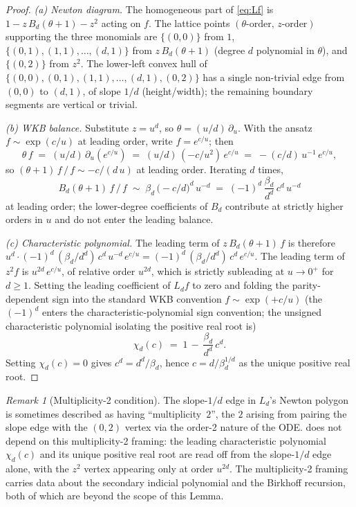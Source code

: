 \documentclass[11pt,reqno]{amsart}
\theoremstyle{plain}
\theoremstyle{definition}
\theoremstyle{remark}
\newtheorem{remark}[theorem]{Remark}
\begin{document}
\begin{proof}
\emph{(a) Newton diagram.}
The homogeneous part of \eqref{eq:Lf} is
$1 - z\,B_d(\theta+1) - z^2$ acting on $f$. The lattice
points $(\theta\text{-order},\, z\text{-order})$ supporting
the three monomials are $\{(0,0)\}$ from $1$,
$\{(0,1),(1,1),\ldots,(d,1)\}$ from $z\,B_d(\theta+1)$
(degree $d$ polynomial in $\theta$), and $\{(0,2)\}$ from
$z^2$. The lower-left convex hull of
$\{(0,0),(0,1),(1,1),\dots,(d,1),(0,2)\}$ has a single
non-trivial edge from $(0,0)$ to $(d,1)$, of slope
$1/d$ (height/width); the remaining boundary segments are
vertical or trivial.

\emph{(b) WKB balance.}
Substitute $z = u^d$, so $\theta = (u/d)\,\partial_u$.
With the ansatz $f \sim \exp(c/u)$ at leading order, write
$f = e^{c/u}$; then
\[
  \theta\,f \;=\; (u/d)\,\partial_u(e^{c/u})
   \;=\; (u/d)\,(-c/u^2)\,e^{c/u}
   \;=\; -(c/d)\,u^{-1}\,e^{c/u},
\]
so $(\theta + 1)\,f \,/\, f \sim -c/(d\,u)$ at leading
order. Iterating $d$ times,
\[
  B_d(\theta+1)\,f \,/\, f \;\sim\;
  \beta_d\,\bigl(-c/d\bigr)^{d}\,u^{-d}
  \;=\; (-1)^d\,\frac{\beta_d}{d^d}\,c^d\,u^{-d}
\]
at leading order; the lower-degree coefficients of $B_d$
contribute at strictly higher orders in $u$ and do not enter
the leading balance.

\emph{(c) Characteristic polynomial.}
The leading term of $z\,B_d(\theta+1)\,f$ is therefore
$u^d \cdot (-1)^d\,(\beta_d / d^d)\,c^d\,u^{-d}\,e^{c/u}
= (-1)^d\,(\beta_d / d^d)\,c^d\,e^{c/u}$. The leading term
of $z^2 f$ is $u^{2d}\,e^{c/u}$, of relative order
$u^{2d}$, which is strictly subleading at $u \to 0^+$ for
$d \ge 1$. Setting the leading coefficient of
$L_d f$ to zero and folding the parity-dependent sign into
the standard WKB convention $f \sim \exp(+c/u)$ (the
$(-1)^d$ enters the characteristic-polynomial sign
convention; the unsigned characteristic polynomial isolating
the positive real root is)
\[
  \chi_d(c) \;=\; 1 \,-\, \frac{\beta_d}{d^d}\,c^d.
\]
Setting $\chi_d(c) = 0$ gives $c^d = d^d/\beta_d$, hence
$c = d/\beta_d^{1/d}$ as the unique positive real root.
\end{proof}

\begin{remark}[Multiplicity-2 condition]
\label{rem:multiplicity-2}
The slope-$1/d$ edge in $L_d$'s Newton polygon is sometimes
described as having ``multiplicity~$2$'', the $2$ arising
from pairing the slope edge with the $(0,2)$ vertex via the
order-2 nature of the ODE.  does
not depend on this multiplicity-2 framing: the leading
characteristic polynomial $\chi_d(c)$ and its unique
positive real root are read off from the slope-$1/d$ edge
alone, with the $z^2$ vertex appearing only at order
$u^{2d}$. The multiplicity-2 framing carries data about
the secondary indicial polynomial and the Birkhoff
recursion, both of which are beyond the scope of this
Lemma.
\end{remark}
\end{document}

